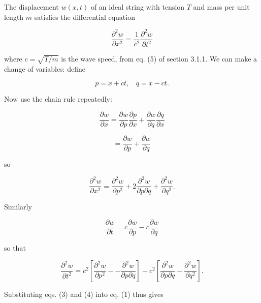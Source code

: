   The displacement $w(x,t)$ of an ideal string with tension $T$ and mass per 
  unit length $m$ satisfies the differential equation 

  \begin{equation*}\frac{\partial^2w}{\partial x^2}= \frac{1}{c^2} 
  \frac{\partial^2w}{\partial t^2}\tag{1}\end{equation*} 

  \noindent{}where $c=\sqrt{T/m}$ is the wave speed, from eq. (5) of section 
  3.1.1. We can make a change of variables: define 

  \begin{equation*}p=x+ct,\mathrm{~~~~}q=x-ct. \tag{2}\end{equation*} 

  Now use the chain rule repeatedly: 

  \begin{equation*}\frac{\partial w}{\partial x}=\frac{\partial w}{\partial 
  p}\frac{\partial p}{\partial x}+\frac{\partial w}{\partial q}\frac{\partial 
  q}{\partial x}\end{equation*} 

  \begin{equation*}=\frac{\partial w}{\partial p}+\frac{\partial w}{\partial 
  q}\end{equation*} 

  \noindent{}so 

  \begin{equation*}\frac{\partial^2 w}{\partial x^2}=\frac{\partial^2 
  w}{\partial p^2}+2\frac{\partial^2 w}{\partial p \partial q}+\frac{\partial^2 
  w}{\partial q^2} . \tag{3}\end{equation*} 

  Similarly 

  \begin{equation*}\frac{\partial w}{\partial t}=c \frac{\partial w}{\partial 
  p} -c \frac{\partial w}{\partial q}\end{equation*} 

  \noindent{}so that 

  \begin{equation*}\frac{\partial^2 w}{\partial t^2}= c^2 \left[ 
  \frac{\partial^2 w}{\partial p^2} -- \frac{\partial^2 w}{\partial p \partial 
  q} \right]-c^2 \left[ \frac{\partial^2 w}{\partial p \partial q} 
  -\frac{\partial^2 w}{\partial q^2} \right] . \tag{4}\end{equation*} 

  Substituting eqs. (3) and (4) into eq. (1) thus gives 

